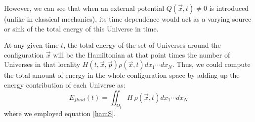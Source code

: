 \documentclass[11pt, a4paper]{article} %
\begin{document}
However, we can see that when an external potential $Q(\vec{x},t)\neq 0$ is introduced (unlike in classical mechanics), its time dependence would act as a varying source or sink of the total energy of this Universe in time.

At any given time $t$, the total energy of the set of Universes around the configuration $\vec{x}$ will be the Hamiltonian at that point times the number of Universes in that locality $H(t, \vec{x}, \vec{p})\rho(\vec{x},t)dx_1\cdots dx_N$. Thus, we could compute the total amount of energy in the whole configuration space by adding up the energy contribution of each Universe as:
\begin{equation}
E_{fluid}(t)=\iint_{\Omega_t} H\ \rho(\vec{x},t)dx_1\cdots dx_N
\end{equation}
where we employed equation \eqref{hamS}.
\end{document}
